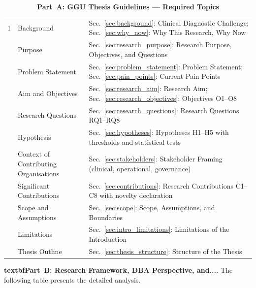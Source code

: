 \begin{table}[!htbp]
\caption{Appendix Ch1 Ggu Checklist Table 1}
\tablestripes
\caption*{\textbf{Part~A: GGU Thesis Guidelines --- Required Topics}}
\tablefontsize
\begin{tabularx}{\textwidth}{@{} p{0.4cm} L L @{}}
\toprule
\thead{\#} &  &  \\
 & Background & Sec.~\ref{sec:background}: Clinical Diagnostic Challenge; Sec.~\ref{sec:why_now}: Why This Research, Why Now \\
 & Purpose & Sec.~\ref{sec:research_purpose}: Research Purpose, Objectives, and Questions \\
 & Problem Statement & Sec.~\ref{sec:problem_statement}: Problem Statement; Sec.~\ref{sec:pain_points}: Current Pain Points \\
 & Aim and Objectives & Sec.~\ref{sec:research_aim}: Research Aim; Sec.~\ref{sec:research_objectives}: Objectives O1--O8 \\
 & Research Questions & Sec.~\ref{sec:research_questions}: Research Questions RQ1--RQ8 \\
 & Hypothesis & Sec.~\ref{sec:hypotheses}: Hypotheses H1--H5 with thresholds and statistical tests \\
 & Context of Contributing Organisations & Sec.~\ref{sec:stakeholders}: Stakeholder Framing (clinical, operational, governance) \\
 & Significant Contributions & Sec.~\ref{sec:contributions}: Research Contributions C1--C8 with novelty declaration \\
 & Scope and Assumptions & Sec.~\ref{sec:scope}: Scope, Assumptions, and Boundaries \\
 & Limitations & Sec.~\ref{sec:intro_limitations}: Limitations of the Introduction \\
 & Thesis Outline & Sec.~\ref{sec:thesis_structure}: Structure of the Thesis \\
\bottomrule
\end{tabularx}
\end{table}

\noindent\textbf{textbfPart~B: Research Framework, DBA Perspective, and....} The following table presents the detailed analysis.


